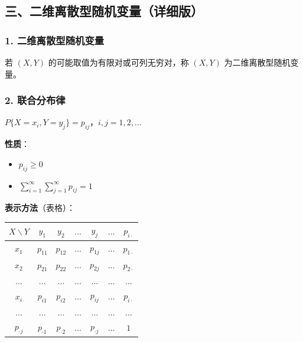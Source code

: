 \documentclass[12pt,a4paper]{ctexart}
\begin{document}
\subsection{三、二维离散型随机变量（详细版）}

\subsubsection{1. 二维离散型随机变量}
若 $(X, Y)$ 的可能取值为有限对或可列无穷对，称 $(X, Y)$ 为二维离散型随机变量。

\subsubsection{2. 联合分布律}
$P\{X = x_i, Y = y_j\} = p_{ij}$，$i, j = 1, 2, \dots$

\textbf{性质}：
\begin{itemize}[noitemsep]
    \item $p_{ij} \ge 0$
    \item $\sum_{i=1}^\infty \sum_{j=1}^\infty p_{ij} = 1$
\end{itemize}

\textbf{表示方法}（表格）：

\begin{center}
    \begin{tabular}{@{}c|ccccc|c@{}}
        \toprule
        $X \backslash Y$ & $y_1$         & $y_2$         & $\dots$ & $y_j$         & $\dots$ & $p_{i\cdot}$ \\
        \midrule
        $x_1$            & $p_{11}$      & $p_{12}$      & $\dots$ & $p_{1j}$      & $\dots$ & $p_{1\cdot}$ \\
        $x_2$            & $p_{21}$      & $p_{22}$      & $\dots$ & $p_{2j}$      & $\dots$ & $p_{2\cdot}$ \\
        $\dots$          & $\dots$       & $\dots$       & $\dots$ & $\dots$       & $\dots$ & $\dots$      \\
        $x_i$            & $p_{i1}$      & $p_{i2}$      & $\dots$ & $p_{ij}$      & $\dots$ & $p_{i\cdot}$ \\
        $\dots$          & $\dots$       & $\dots$       & $\dots$ & $\dots$       & $\dots$ & $\dots$      \\
        \midrule
        $p_{\cdot j}$    & $p_{\cdot 1}$ & $p_{\cdot 2}$ & $\dots$ & $p_{\cdot j}$ & $\dots$ & $1$          \\
        \bottomrule
    \end{tabular}
\end{center}
\end{document}
